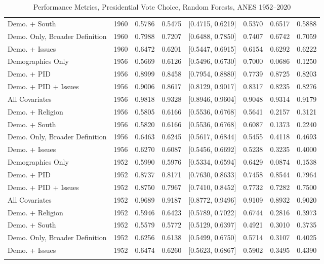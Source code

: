 \begin{longtable}{lrrrlrrr}
  Demo. + South & 1960 & 0.5786 & 0.5475 & [0.4715, 0.6219] & 0.5370 & 0.6517 & 0.5888 \\ 
  Demo. Only, Broader Definition & 1960 & 0.7988 & 0.7207 & [0.6488, 0.7850] & 0.7407 & 0.6742 & 0.7059 \\ 
  Demo. + Issues & 1960 & 0.6472 & 0.6201 & [0.5447, 0.6915] & 0.6154 & 0.6292 & 0.6222 \\ 
  Demographics Only & 1956 & 0.5669 & 0.6126 & [0.5496, 0.6730] & 0.7000 & 0.0686 & 0.1250 \\ 
  Demo. + PID & 1956 & 0.8999 & 0.8458 & [0.7954, 0.8880] & 0.7739 & 0.8725 & 0.8203 \\ 
  Demo. + PID + Issues & 1956 & 0.9006 & 0.8617 & [0.8129, 0.9017] & 0.8317 & 0.8235 & 0.8276 \\ 
  All Covariates & 1956 & 0.9818 & 0.9328 & [0.8946, 0.9604] & 0.9048 & 0.9314 & 0.9179 \\ 
  Demo. + Religion & 1956 & 0.5805 & 0.6166 & [0.5536, 0.6768] & 0.5641 & 0.2157 & 0.3121 \\ 
  Demo. + South & 1956 & 0.5820 & 0.6166 & [0.5536, 0.6768] & 0.6087 & 0.1373 & 0.2240 \\ 
  Demo. Only, Broader Definition & 1956 & 0.6463 & 0.6245 & [0.5617, 0.6844] & 0.5455 & 0.4118 & 0.4693 \\ 
  Demo. + Issues & 1956 & 0.6270 & 0.6087 & [0.5456, 0.6692] & 0.5238 & 0.3235 & 0.4000 \\ 
  Demographics Only & 1952 & 0.5990 & 0.5976 & [0.5334, 0.6594] & 0.6429 & 0.0874 & 0.1538 \\ 
  Demo. + PID & 1952 & 0.8737 & 0.8171 & [0.7630, 0.8633] & 0.7458 & 0.8544 & 0.7964 \\ 
  Demo. + PID + Issues & 1952 & 0.8750 & 0.7967 & [0.7410, 0.8452] & 0.7732 & 0.7282 & 0.7500 \\ 
  All Covariates & 1952 & 0.9689 & 0.9187 & [0.8772, 0.9496] & 0.9109 & 0.8932 & 0.9020 \\ 
  Demo. + Religion & 1952 & 0.5946 & 0.6423 & [0.5789, 0.7022] & 0.6744 & 0.2816 & 0.3973 \\ 
  Demo. + South & 1952 & 0.5579 & 0.5772 & [0.5129, 0.6397] & 0.4921 & 0.3010 & 0.3735 \\ 
  Demo. Only, Broader Definition & 1952 & 0.6256 & 0.6138 & [0.5499, 0.6750] & 0.5714 & 0.3107 & 0.4025 \\ 
  Demo. + Issues & 1952 & 0.6474 & 0.6260 & [0.5623, 0.6867] & 0.5902 & 0.3495 & 0.4390 \\ 
   \bottomrule
\caption{Performance Metrics, Presidential Vote Choice, Random Forests, ANES 1952--2020} 
\label{tab:ANES_prezvote_rf}
\end{longtable}
